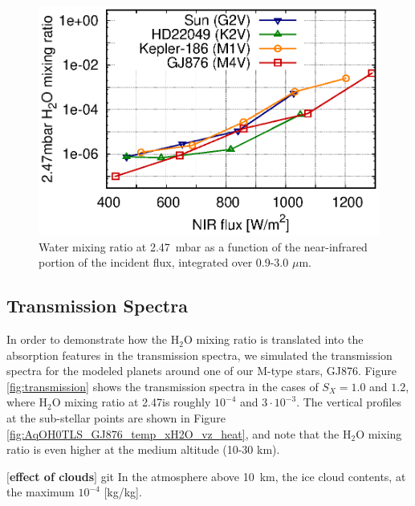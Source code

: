 \documentclass[11pt,numberedappendix,twocolappendix,]{emulateapj}
\def\water{H$_2$O }
\def\preslevel{2.47}
\def\memo#1{\color{red}$[${\bf #1}$]$ \color{black}}
\begin{document}
\begin{figure}[!h]
    \begin{center}
    \includegraphics[width=\hsize]{fig/AqOH0TLS_FNIR_xH2O_247mbar.eps}
    \end{center}
\caption{Water mixing ratio at \preslevel ~mbar as a function of the near-infrared portion of the incident flux, integrated over 0.9-3.0 $\mu $m. }                                                                                                             
\label{fig:qOH0TLS_FNIR_xH2O_247mbar}
\end{figure}

\subsection{Transmission Spectra}
\label{ss:result_TransmissionSpectra}

In order to demonstrate how the \water mixing ratio is translated into the absorption features in the transmission spectra, 
we simulated the transmission spectra for the modeled planets around one of our M-type stars, GJ876. 
Figure \ref{fig:transmission} shows the transmission spectra in the cases of $S_X=1.0$ and $1.2$, where \water mixing ratio at \preslevel is roughly $10^{-4}$ and $3\cdot 10^{-3}$. 
The vertical profiles at the sub-stellar points are shown in Figure \ref{fig:AqOH0TLS_GJ876_temp_xH2O_vz_heat}, and note that the \water mixing ratio is even higher at the medium altitude (10-30 km). 

\memo{effect of clouds}git
In the atmosphere above 10~km, the ice cloud contents, at the maximum $10^{-4}$ [kg/kg]. 
\end{document}

